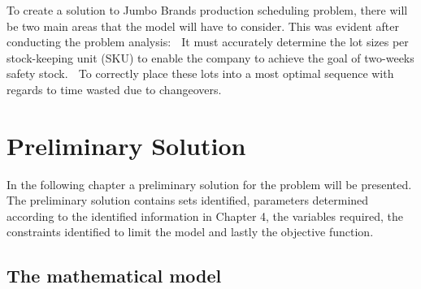 \documentclass[a4paper,11pt,fleqn]{report}
\begin{document}
    To create a solution to Jumbo Brands production scheduling problem, there will be two main areas that the model will have to consider. This was evident after conducting the problem analysis:
     It must accurately determine the lot sizes per stock-keeping unit (SKU) to enable the company to achieve the goal of two-weeks safety stock.
     To correctly place these lots into a most optimal sequence with regards to time wasted due to changeovers.
    
\chapter{Preliminary Solution}
\acresetall

    In the following chapter a preliminary solution for the problem will be presented. The preliminary solution contains sets identified, parameters determined according to the identified information in Chapter 4, the variables required, the constraints identified to limit the model and lastly the objective function.

    \section{The mathematical model}
\end{document}
